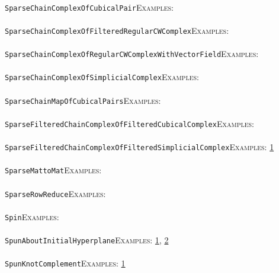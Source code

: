 \documentclass[a4paper,11pt]{report}
\begin{document}
{{ \\
 \texttt{SparseChainComplexOfCubicalPair}{\nobreakspace}{\nobreakspace}{\nobreakspace}{\nobreakspace}\textsc{Examples:} \\
 \\
 \texttt{SparseChainComplexOfFilteredRegularCWComplex}{\nobreakspace}{\nobreakspace}{\nobreakspace}{\nobreakspace}\textsc{Examples:} \\
 \\
 \texttt{SparseChainComplexOfRegularCWComplexWithVectorField}{\nobreakspace}{\nobreakspace}{\nobreakspace}{\nobreakspace}\textsc{Examples:} \\
 \\
 \texttt{SparseChainComplexOfSimplicialComplex}{\nobreakspace}{\nobreakspace}{\nobreakspace}{\nobreakspace}\textsc{Examples:} \\
 \\
 \texttt{SparseChainMapOfCubicalPairs}{\nobreakspace}{\nobreakspace}{\nobreakspace}{\nobreakspace}\textsc{Examples:} \\
 \\
 \texttt{SparseFilteredChainComplexOfFilteredCubicalComplex}{\nobreakspace}{\nobreakspace}{\nobreakspace}{\nobreakspace}\textsc{Examples:} \\
 \\
 \texttt{SparseFilteredChainComplexOfFilteredSimplicialComplex}{\nobreakspace}{\nobreakspace}{\nobreakspace}{\nobreakspace}\textsc{Examples:} \href{../www/SideLinks/About/aboutPersistent.html} {1}{\nobreakspace} \\
 \\
 \texttt{SparseMattoMat}{\nobreakspace}{\nobreakspace}{\nobreakspace}{\nobreakspace}\textsc{Examples:} \\
 \\
 \texttt{SparseRowReduce}{\nobreakspace}{\nobreakspace}{\nobreakspace}{\nobreakspace}\textsc{Examples:} \\
 \\
 \texttt{Spin}{\nobreakspace}{\nobreakspace}{\nobreakspace}{\nobreakspace}\textsc{Examples:} \\
 \\
 \texttt{SpunAboutInitialHyperplane}{\nobreakspace}{\nobreakspace}{\nobreakspace}{\nobreakspace}\textsc{Examples:} \href{tutorial/chap3.html} {1}{\nobreakspace}, \href{../www/SideLinks/About/aboutCoverinSpaces.html} {2}{\nobreakspace} \\
 \\
 \texttt{SpunKnotComplement}{\nobreakspace}{\nobreakspace}{\nobreakspace}{\nobreakspace}\textsc{Examples:} \href{../www/SideLinks/About/aboutCoverinSpaces.html} {1}{\nobreakspace} \\
}}
\end{document}
